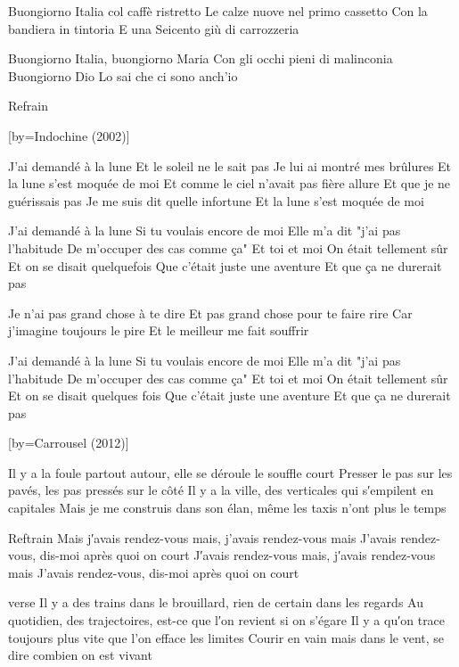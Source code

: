 \beginverse
Buongiorno Italia col caffè ristretto
Le calze nuove nel primo cassetto
Con la bandiera in tintoria
E una Seicento giù di carrozzeria
\endverse

\beginverse
Buongiorno Italia, buongiorno Maria
Con gli occhi pieni di malinconia
Buongiorno Dio
Lo sai che ci sono anch'io
\endverse

\beginverse
Refrain \\[bis]
\endverse

[by={Indochine (2002)}]

\beginverse
J'ai demandé à la lune
Et le soleil ne le sait pas
Je lui ai montré mes brûlures
Et la lune s'est moquée de moi
Et comme le ciel n'avait pas fière allure
Et que je ne guérissais pas
Je me suis dit quelle infortune
Et la lune s'est moquée de moi
\endverse

\beginverse
J'ai demandé à la lune
Si tu voulais encore de moi
Elle m'a dit "j'ai pas l'habitude
De m'occuper des cas comme ça"
Et toi et moi
On était tellement sûr
Et on se disait quelquefois
Que c'était juste une aventure
Et que ça ne durerait pas
\endverse

\beginverse
Je n'ai pas grand chose à te dire
Et pas grand chose pour te faire rire
Car j'imagine toujours le pire
Et le meilleur me fait souffrir
\endverse

\beginverse
J'ai demandé à la lune
Si tu voulais encore de moi
Elle m'a dit "j'ai pas l'habitude
De m'occuper des cas comme ça"
Et toi et moi
On était tellement sûr
Et on se disait quelques fois
Que c'était juste une aventure
Et que ça ne durerait pas
\endverse

[by={Carrousel (2012)}]

\beginverse
Il y a la foule partout autour, elle se déroule le souffle court
Presser le pas sur les pavés, les pas pressés sur le côté
Il y a la ville, des verticales qui s′empilent en capitales
Mais je me construis dans son élan, même les taxis n'ont plus le temps
\endverse

\beginverse
Reftrain
Mais j′avais rendez-vous mais, j'avais rendez-vous mais
J'avais rendez-vous, dis-moi après quoi on court
J′avais rendez-vous mais, j′avais rendez-vous mais
J'avais rendez-vous, dis-moi après quoi on court
\endverse

\beginverse
verse
Il y a des trains dans le brouillard, rien de certain dans les regards
Au quotidien, des trajectoires, est-ce que l′on revient si on s'égare
Il y a qu′on trace toujours plus vite que l'on efface les limites
Courir en vain mais dans le vent, se dire combien on est vivant
\endverse

